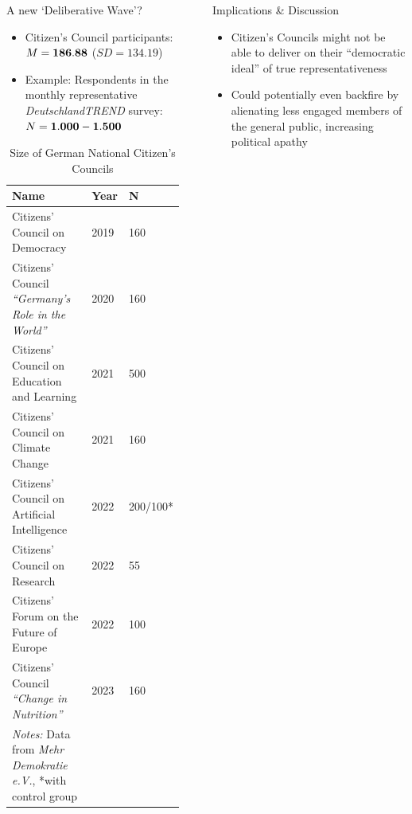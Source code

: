 \documentclass[final]{beamer}
\newlength{\sepwidth}
\newlength{\colwidth}
\newcommand{\separatorcolumn}{\begin{column}{\sepwidth}\end{column}}
\begin{document}
\begin{frame}[t]
\begin{columns}[t]
\begin{column}{\colwidth}
    \begin{block}{A new ‘Deliberative Wave’?}

    \begin{itemize}
        \item Citizen's Council participants: $M = \vb{186.88}$ ($SD = 134.19$)
        \item Example: Respondents in the monthly representative \textit{DeutschlandTREND} survey: $N = \vb{1.000 - 1.500}$
    \end{itemize}


\begin{table}[]
\label{tab:councils}
\caption{Size of German National Citizen's Councils}
\begin{tabular}{@{}lll@{}}
\toprule
\textbf{Name} & \textbf{Year} & \textbf{N} \\ 
\midrule
Citizens' Council on Democracy & 2019 & 160 \\
Citizens' Council \textit{``Germany's Role in the World''} & 2020 & 160 \\
Citizens' Council on Education and Learning & 2021 & 500 \\
Citizens' Council on Climate Change & 2021 & 160 \\
Citizens' Council on Artificial Intelligence & 2022 & 200/100* \\
Citizens' Council on Research & 2022 & 55 \\
Citizens' Forum on the Future of Europe & 2022 & 100 \\
Citizens' Council \textit{``Change in Nutrition''} & 2023 & 160 \\
\bottomrule
\small\textit{Notes:} Data from \textit{Mehr Demokratie e.V.},  *with control group
\end{tabular}
\end{table}

\end{block}
  
\end{column}
\separatorcolumn

\begin{column}{\colwidth}

  \begin{alertblock}{Implications \& Discussion}
    \vspace{-0.5ex}
    \begin{itemize}
        \item Citizen's Councils might not be able to deliver on their ``democratic ideal'' of true representativeness
        \vspace{0.5ex}
        \item Could potentially even backfire by alienating less engaged members of the general public, increasing political apathy
    \end{itemize}


\end{alertblock}
\end{column}
\end{columns}
\end{frame}
\end{document}
